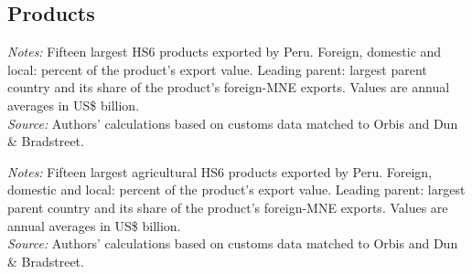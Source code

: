 \documentclass[11pt,a4paper]{article}
\begin{document}
\subsection{Products}
\begin{table}[H]\centering\footnotesize%
  \caption{Peru: Fifteen Largest Export Products}%
  \label{tab:c_hs6_PER}%
  \par\vspace{3pt}%
  \begin{minipage}{0.95\textwidth}\footnotesize %
  \textit{Notes:} Fifteen largest HS6 products exported by Peru. Foreign, domestic and local: percent of the product's export value. Leading parent: largest parent country and its share of the product's foreign-MNE exports. Values are annual averages in US\$ billion.\\[3pt]%
  \textit{Source:} Authors' calculations based on customs data matched to Orbis and Dun \& Bradstreet.%
  \end{minipage}%
  \end{table}
\begin{table}[H]\centering\footnotesize%
  \caption{Peru, Agriculture: Fifteen Largest Export Products}%
  \label{tab:c_hs6_PER_agro}%
  \par\vspace{3pt}%
  \begin{minipage}{0.95\textwidth}\footnotesize %
  \textit{Notes:} Fifteen largest agricultural HS6 products exported by Peru. Foreign, domestic and local: percent of the product's export value. Leading parent: largest parent country and its share of the product's foreign-MNE exports. Values are annual averages in US\$ billion.\\[3pt]%
  \textit{Source:} Authors' calculations based on customs data matched to Orbis and Dun \& Bradstreet.%
  \end{minipage}%
  \end{table}
\end{document}
